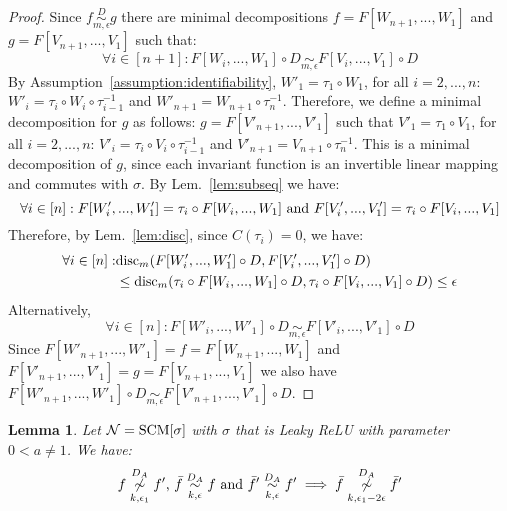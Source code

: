 \documentclass{article} %
\newtheorem{lem}{Lemma}
\newcommand{\disc}{\textnormal{disc}}
\begin{document}
\begin{proof} Since $f \overset{D}{\underset{m,\epsilon}{\sim}} g$ there are minimal decompositions $f = F[W_{n+1},...,W_1]$ and $g = F[V_{n+1},...,V_1]$ such that:
\begin{equation}
\forall i \in [n+1]: F[W_i,...,W_1] \circ D \underset{m,\epsilon}{\sim} F[V_i,...,V_1] \circ D
\end{equation}
By Assumption~\ref{assumption:identifiability}, $W'_1 = \tau_1 \circ W_1$, for all $i = 2,...,n$: $W'_i = \tau_i \circ W_i \circ \tau^{-1}_{i-1}$ and $W'_{n+1} = W_{n+1} \circ \tau^{-1}_{n}$. Therefore, we define a minimal decomposition for $g$ as follows: $g = F[V'_{n+1},...,V'_1]$ such that $V'_1 = \tau_1 \circ V_1$, for all $i = 2,...,n$: $V'_i = \tau_i \circ V_i \circ \tau^{-1}_{i-1}$ and $V'_{n+1} = V_{n+1} \circ \tau^{-1}_{n}$. This is a minimal decomposition of $g$, since each invariant function is an invertible linear mapping and commutes with $\sigma$. By Lem.~\ref{lem:subseq} we have:
\begin{equation}
\forall i \in [n]: F[W'_i,...,W'_1] = \tau_i \circ F[W_i,...,W_1] \textnormal{ and } F[V'_i,...,V'_1] = \tau_i \circ F[V_i,...,V_1] 
\end{equation}
Therefore, by Lem.~\ref{lem:disc}, since $C(\tau_i) = 0$, we have:
\begin{equation}
\begin{aligned}
\forall i\in [n]: & \disc_{m}(F[W'_i,...,W'_1] \circ D,F[V'_i,...,V'_1] \circ D) \\
&\leq \disc_{m}(\tau_i \circ F[W_i,...,W_1] \circ D, \tau_i \circ F[V_i,...,V_1] \circ D) \leq \epsilon
\end{aligned}
\end{equation}
Alternatively, 
\begin{equation}
\forall i \in [n]: F[W'_i,...,W'_1] \circ D \underset{m,\epsilon}{\sim} F[V'_i,...,V'_1] \circ D
\end{equation}
Since $F[W'_{n+1},...,W'_1] = f = F[W_{n+1},...,W_1]$ and $F[V'_{n+1},...,V'_1] = g = F[V_{n+1},...,V_1]$ we also have $F[W'_{n+1},...,W'_1] \circ D \underset{m,\epsilon}{\sim} F[V'_{n+1},...,V'_1] \circ D$.
\end{proof}

 

\begin{lem}\label{lem:reduceNotSem} Let $\mathcal{N} = \textnormal{SCM}[\sigma]$ with $\sigma$ that is Leaky ReLU with parameter $0<a\neq 1$. We have:
\begin{equation}
\textnormal {$f \overset{D_A}{\underset{k,\epsilon_1}{\not\sim}} f'$, $\bar{f} \overset{D_A}{\underset{k,\epsilon}{\sim}} f$ and $\bar{f}' \overset{D_A}{\underset{k,\epsilon}{\sim}} f'$} \implies \bar{f} \overset{D_A}{\underset{k,\epsilon_1-2\epsilon}{\not\sim}} \bar{f}'
\end{equation}
\end{lem}
\end{document}
